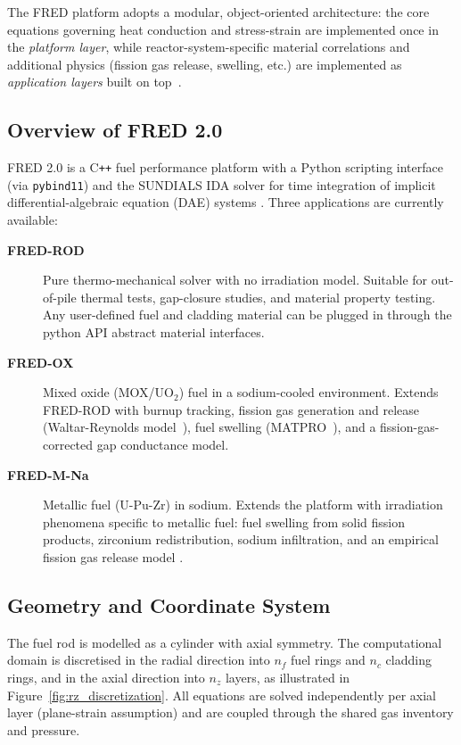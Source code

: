 \begin{refsection}
The FRED platform adopts a modular, object-oriented architecture: the core equations governing heat conduction and stress-strain are implemented once in the \emph{platform layer}, while reactor-system-specific material correlations and additional physics (fission gas release, swelling, etc.) are implemented as \emph{application layers} built on top~\cite{hindmarsh2005}.

\subsection{Overview of FRED 2.0}

FRED 2.0 is a C\texttt{++} fuel performance platform with a Python scripting interface (via \texttt{pybind11}) and the SUNDIALS IDA solver for time integration of implicit differential-algebraic equation (DAE) systems \cite{hindmarsh2005}.  Three applications are currently available:

\begin{description}
\item[\textbf{FRED-ROD}] Pure thermo-mechanical solver with no irradiation model.  Suitable for out-of-pile thermal tests, gap-closure studies, and material property testing.  Any user-defined fuel and cladding material can be plugged in through the python API abstract material interfaces.

\item[\textbf{FRED-OX}] Mixed oxide (MOX/UO$_2$) fuel in a sodium-cooled environment.  Extends FRED-ROD with burnup tracking, fission gas generation and release (Waltar-Reynolds model~\cite{waltar1981}), fuel swelling (MATPRO~\cite{hagrman1981}), and a fission-gas-corrected gap conductance model.

\item[\textbf{FRED-M-Na}] Metallic fuel (U-Pu-Zr) in sodium.  Extends the platform with irradiation phenomena specific to metallic fuel: fuel swelling from solid fission products, zirconium redistribution, sodium infiltration, and an empirical fission gas release model \cite{karahan2009}.
\end{description}

\subsection{Geometry and Coordinate System}

The fuel rod is modelled as a cylinder with axial symmetry.  The computational domain is discretised in the radial direction into $n_f$ fuel rings and $n_c$ cladding rings, and in the axial direction into $n_z$ layers, as illustrated in Figure~\ref{fig:rz_discretization}.  All equations are solved independently per axial layer (plane-strain assumption) and are coupled through the shared gas inventory and pressure.


\end{refsection}

